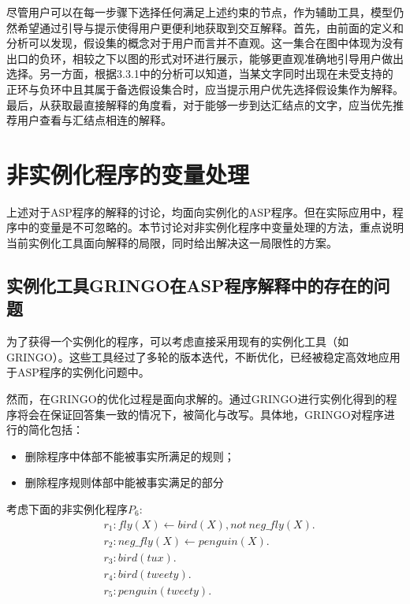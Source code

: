 尽管用户可以在每一步骤下选择任何满足上述约束的节点，作为辅助工具，模型仍然希望通过引导与提示使得用户更便利地获取到交互解释。首先，由前面的定义和分析可以发现，假设集的概念对于用户而言并不直观。这一集合在图中体现为没有出口的负环，相较之下以图的形式对环进行展示，能够更直观准确地引导用户做出选择。另一方面，根据3.3.1中的分析可以知道，当某文字同时出现在未受支持的正环与负环中且其属于备选假设集合时，应当提示用户优先选择假设集作为解释。最后，从获取最直接解释的角度看，对于能够一步到达汇结点的文字，应当优先推荐用户查看与汇结点相连的解释。

\section{非实例化程序的变量处理}
上述对于ASP程序的解释的讨论，均面向实例化的ASP程序。但在实际应用中，程序中的变量是不可忽略的。本节讨论对非实例化程序中变量处理的方法，重点说明当前实例化工具面向解释的局限，同时给出解决这一局限性的方案。

\subsection{实例化工具\textsf{GRINGO}在ASP程序解释中的存在的问题}
为了获得一个实例化的程序，可以考虑直接采用现有的实例化工具（如\textsf{GRINGO}\cite{gebserGringoNewGrounder2007}）。这些工具经过了多轮的版本迭代，不断优化\cite{gebser2011advances,gebser2015abstract}，已经被稳定高效地应用于ASP程序的实例化问题中\cite{kaufmannGroundingSolvingAnswer2016}。

然而，在\textsf{GRINGO}的优化过程是面向求解的。通过\textsf{GRINGO}进行实例化得到的程序将会在保证回答集一致的情况下，被简化与改写。具体地，\textsf{GRINGO}对程序进行的简化包括：

\begin{itemize}[topsep = 0pt]
    \setlength\itemsep{-0.3em}
    \item 删除程序中体部不能被事实所满足的规则；
    \item 删除程序规则体部中能被事实满足的部分
\end{itemize}

\begin{example}
    考虑下面的非实例化程序$P_6$:
    \begin{align*}
        &r_1: fly(X) \leftarrow bird(X), not\ neg\_fly(X). \\
        &r_2: neg\_fly(X) \leftarrow penguin(X).\\
        &r_3: bird(tux).\\
        &r_4: bird(tweety).\\
        &r_5: penguin(tweety).
    \end{align*}
\end{example}


